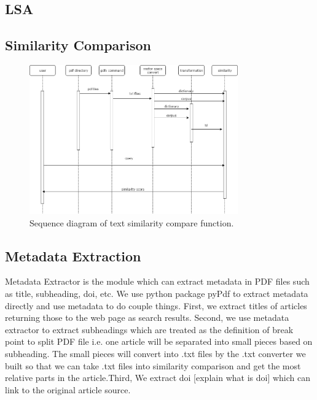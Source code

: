 \subsection{LSA}
\subsection{Similarity Comparison}
	\begin{figure}[htb]
		\begin{center}
			\includegraphics[width=0.8\textwidth]{Rainy_Sequence_diagram}
		\end{center}
		\caption{Sequence diagram of text similarity compare function.\label{Sequence diagram}}
	\end{figure}
	\newpage
\subsection{Metadata Extraction}
Metadata Extractor is the module which can extract metadata in PDF files such as title, subheading, doi, etc. We use python package pyPdf to extract metadata directly and use metadata to do couple things. First, we extract titles of articles returning those to the web page as search results. Second, we use metadata extractor to extract subheadings which are treated as the definition of break point to split PDF file i.e. one article will be separated into small pieces based on subheading. The small pieces will convert into .txt files by the .txt converter we built so that we can take .txt files into similarity comparison and get the most relative parts in the article.Third, We extract doi [explain what is doi] which can link to the original article source. 